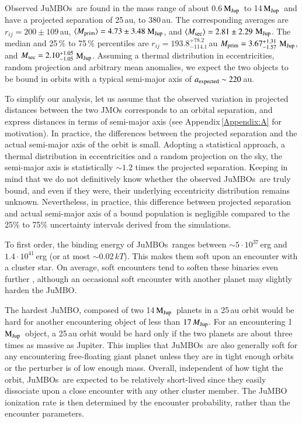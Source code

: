 \documentclass[submission,phys]{lib/SciPost}
\newcommand{\MJup}{\mbox{$\mathrm{{M}}_{\rm Jup}$}}
\newcommand{\jumbo}{\mbox{JuMBO}}
\newcommand{\jumbos}{\mbox{JuMBOs}}
\begin{document}
Observed \jumbos\ are found in the mass range of about 0.6\,\MJup\, to
14\,\MJup\, and have a projected separation of 25\,au, to $380$\,au.
The corresponding averages are $r_{ij}=200\pm109$\,au, $\langle
M_{\rm prim}\rangle = 4.73\pm3.48$\,\MJup, and $\langle M_{\rm sec}\rangle =
2.81\pm2.29$\,\MJup. The median and 25\,\% to 75\,\% percentiles are
$r_{ij} = 193.8^{+78.2}_{-114.1}$\,au $M_{\rm prim} =
3.67^{+1.31}_{-1.57}$\,\MJup, and $M_{\rm sec} = 2.10^{+1.05}_{-1.05}$\,\MJup.
Assuming a thermal distribution in eccentricities, random projection
and arbitrary mean anomalies, we expect the two objects to be bound in
orbits with a typical semi-major axis of $a_{\rm expected} \sim
220$\,au.

To simplify our analysis, let us assume that the observed variation in
projected distances between the two JMOs corresponds to an orbital
separation, and express distances in terms of semi-major axis (see
Appendix\,\ref{Appendix:A} for motivation).  In practice, the
differences between the projected separation and the actual semi-major
axis of the orbit is small. Adopting a statistical approach, a thermal
distribution in eccentricities and a random projection on the sky, the
semi-major axis is statistically $\sim 1.2$ times the projected
separation. Keeping in mind that we do not definitively know whether
the observed \jumbos\, are truly bound, and even if they were, their
underlying eccentricity distribution remains unknown. Nevertheless, in
practice, this difference between projected separation and actual
semi-major axis of a bound population is negligible compared to the
25\% to 75\% uncertainty intervals derived from the simulations.

To first order, the binding energy of \jumbos\ ranges between $\sim
5\cdot 10^{37}$\,erg and $1.4\cdot 10^{41}$\,erg (or at most $\sim
0.02$\,$kT$). This makes them soft upon an encounter with a cluster star. 
On average, soft encounters tend to soften these binaries even further
\cite{1975MNRAS.173..729H}, although an occasional soft encounter with
another planet may slightly harden the \jumbo. 

The hardest \jumbo, composed of two 14\,\MJup\, planets in a 25\,au
orbit would be hard for another encountering object of less than
$17\,M_{\rm Jup}$.  For an encountering 1\,\MJup\, object, a 25\,au
orbit would be hard only if the two planets are about three times as
massive as Jupiter.  This implies that \jumbos\, are also generally soft for
any encountering free-floating giant planet unless they are in tight
enough orbits or the perturber is of low enough mass. Overall, independent
of how tight the orbit, \jumbos\, are expected to be relatively short-lived
since they easily dissociate upon a close encounter with any
other cluster member.  The \jumbo\, ionization rate is then determined
by the encounter probability, rather than the encounter parameters.
\end{document}
